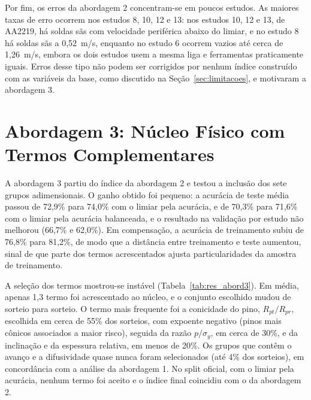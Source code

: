 \documentclass[12pt,openany]{report}
\begin{document}
Por fim, os erros da abordagem 2 concentram-se em poucos estudos. As maiores taxas de erro ocorrem nos estudos 8, 10, 12 e 13: nos estudos 10, 12 e 13, de AA2219, há soldas sãs com velocidade periférica abaixo do limiar, e no estudo 8 há soldas sãs a 0,52~m/s, enquanto no estudo 6 ocorrem vazios até cerca de 1,26~m/s, embora os dois estudos usem a mesma liga e ferramentas praticamente iguais. Erros desse tipo não podem ser corrigidos por nenhum índice construído com as variáveis da base, como discutido na Seção~\ref{sec:limitacoes}, e motivaram a abordagem 3.

\section{Abordagem 3: Núcleo Físico com Termos Complementares}
\label{sec:res_abordagem3}

A abordagem 3 partiu do índice da abordagem 2 e testou a inclusão dos sete grupos adimensionais. O ganho obtido foi pequeno: a acurácia de teste média passou de 72,9\% para 74,0\% com o limiar pela acurácia, e de 70,3\% para 71,6\% com o limiar pela acurácia balanceada, e o resultado na validação por estudo não melhorou (66,7\% e 62,0\%). Em compensação, a acurácia de treinamento subiu de 76,8\% para 81,2\%, de modo que a distância entre treinamento e teste aumentou, sinal de que parte dos termos acrescentados ajusta particularidades da amostra de treinamento.

A seleção dos termos mostrou-se instável (Tabela~\ref{tab:res_abord3}). Em média, apenas 1,3 termo foi acrescentado ao núcleo, e o conjunto escolhido mudou de sorteio para sorteio. O termo mais frequente foi a conicidade do pino, $R_{pt}/R_{pr}$, escolhida em cerca de 55\% dos sorteios, com expoente negativo (pinos mais cônicos associados a maior risco), seguida da razão $p/\sigma_y$, em cerca de 30\%, e da inclinação e da espessura relativa, em menos de 20\%. Os grupos que contêm o avanço e a difusividade quase nunca foram selecionados (até 4\% dos sorteios), em concordância com a análise da abordagem 1. No split oficial, com o limiar pela acurácia, nenhum termo foi aceito e o índice final coincidiu com o da abordagem 2.
\end{document}
